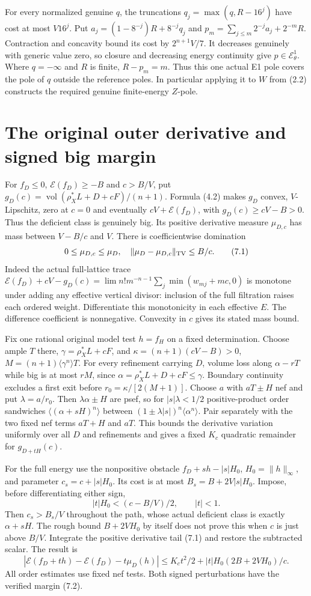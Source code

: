 \documentclass[10pt]{article}
\newcommand{\vol}{\operatorname{vol}}
\newcommand{\EE}{\mathcal E^1_\theta}
\begin{document}
For every normalized genuine $q$, the truncations
$q_j=\max(q,R-16^j)$ have cost at most $V16^j$.
Put $a_j=(1-8^{-j})R+8^{-j}q_j$ and
$p_m=\sum_{j\leq m}2^{-j}a_j+2^{-m}R$.
Contraction and concavity bound its cost by $2^{n+1}V/7$.
It decreases genuinely with generic value zero, so closure and decreasing
energy continuity give $p\in\EE$. Where $q=-\infty$ and $R$ is finite,
$R-p_m=m$. Thus this one actual E1 pole covers the pole of $q$ outside
the reference poles. In particular applying it to $W$ from (2.2)
constructs the required genuine finite-energy $Z$-pole.

\section{The original outer derivative and signed big margin}
For $f_D\leq0$, $\mathscr E(f_D)\geq-B$ and $c>B/V$, put
$g_D(c)=\vol(\rho_X^*L+D+cF)/(n+1)$.
Formula (4.2) makes $g_D$ convex, $V$-Lipschitz, zero at $c=0$ and
eventually $cV+\mathscr E(f_D)$, with $g_D(c)\geq cV-B>0$.
Thus the deficient class is genuinely big. Its positive derivative
measure $\mu_{D,c}$ has mass between $V-B/c$ and $V$.
There is coefficientwise domination
\[
 0\leq\mu_{D,c}\leq\mu_D,
 \quad\|\mu_D-\mu_{D,c}\|_{\rm TV}\leq B/c.
 \tag{7.1}
\]
Indeed the actual full-lattice trace
$\mathscr E(f_D)+cV-g_D(c)
=\lim n!m^{-n-1}\sum_j\min(w_{mj}+mc,0)$ is monotone under
adding any effective vertical divisor: inclusion of the full filtration
raises each ordered weight. Differentiate this monotonicity in each
effective $E$. The difference coefficient is nonnegative. Convexity
in $c$ gives its stated mass bound.

Fix one rational original model test $h=f_H$ on a fixed determination.
Choose ample $T$ there, $\gamma=\rho_X^*L+cF$, and
$\kappa=(n+1)(cV-B)>0$, $M=(n+1)\langle\gamma^n\rangle T$.
For every refinement carrying $D$, volume loss along $\alpha-rT$
while big is at most $rM$, since $\alpha=\rho_X^*L+D+cF\leq\gamma$.
Boundary continuity excludes a first exit before
$r_0=\kappa/[2(M+1)]$. Choose $a$ with $aT\pm H$ nef and put
$\lambda=a/r_0$. Then $\lambda\alpha\pm H$ are psef, so for
$|s|\lambda<1/2$ positive-product order sandwiches
$\langle(\alpha+sH)^n\rangle$ between
$(1\pm\lambda|s|)^n\langle\alpha^n\rangle$.
Pair separately with the two fixed nef terms $aT+H$ and $aT$.
This bounds the derivative variation uniformly over all $D$ and refinements
and gives a fixed $K_c$ quadratic remainder for $g_{D+tH}(c)$.

For the full energy use the nonpositive obstacle
$f_D+sh-|s|H_0$, $H_0=\|h\|_\infty$, and parameter
$c_s=c+|s|H_0$. Its cost is at most $B_s=B+2V|s|H_0$.
Impose, before differentiating either sign,
\[
 |t|H_0<(c-B/V)/2,\qquad |t|<1.
 \tag{7.2}
\]
Then $c_s>B_s/V$ throughout the path, whose actual deficient class is
exactly $\alpha+sH$. The rough bound $B+2VH_0$ by itself does not
prove this when $c$ is just above $B/V$. Integrate the positive derivative
tail (7.1) and restore the subtracted scalar. The result is
\[
 |\mathscr E(f_D+th)-\mathscr E(f_D)-t\mu_D(h)|
 \leq K_ct^2/2+|t|H_0(2B+2VH_0)/c.
 \tag{7.3}
\]
All order estimates use fixed nef tests. Both signed perturbations have
the verified margin (7.2).
\end{document}
